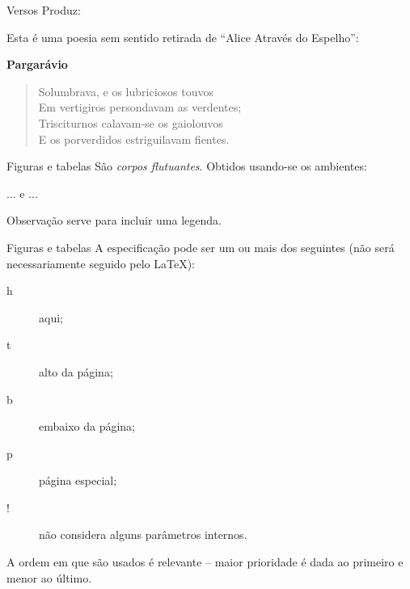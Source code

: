 \begin{frame}{Versos}
Produz:

\begin{LaTeXoutput}
Esta é uma poesia sem sentido retirada de
``Alice Através do Espelho'':

\begin{center}
\textbf{Pargarávio}
\end{center}
\begin{verse}
Solumbrava, e os lubriciosos touvos \\
Em vertigiros persondavam as verdentes; \\
Trisciturnos calavam-se os gaiolouvos \\
E os porverdidos estriguilavam fientes.
\end{verse}
\end{LaTeXoutput}
\end{frame}

\begin{frame}{Figuras e tabelas}
São \emph{corpos flutuantes}. Obtidos usando-se os ambientes:
\begin{LaTeXcode}
\Lopt[especificação] \n
... \n
{} \n
{} \n
e \n
{}\Lopt[especificação] \n
... \n
{} \n
{}
\end{LaTeXcode}

\begin{block}{Observação}
 serve para incluir uma legenda.
\end{block}
\end{frame}

\begin{frame}{Figuras e tabelas}
A especificação pode ser um ou mais dos seguintes (não será necessariamente seguido pelo \LaTeX):
\begin{description}
\item [h] aqui;
\item [t] alto da página;
\item [b] embaixo da página;
\item [p] página especial;
\item [!] não considera alguns parâmetros internos.
\end{description}

\begin{block}{}
A ordem em que são usados é relevante -- maior prioridade é dada ao primeiro e menor ao último.
\end{block}
\end{frame}

